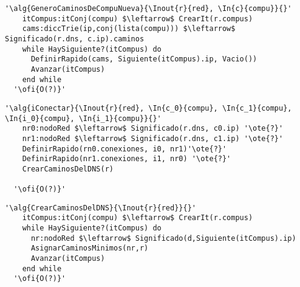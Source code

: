 \begin{lstlisting}[mathescape]
  '\alg{GeneroCaminosDeCompuNueva}{\Inout{r}{red}, \In{c}{compu}}{}'
    itCompus:itConj(compu) $\leftarrow$ CrearIt(r.compus)
    cams:diccTrie(ip,conj(lista(compu))) $\leftarrow$ Significado(r.dns, c.ip).caminos
    while HaySiguiente?(itCompus) do                                                    
      DefinirRapido(cams, Siguiente(itCompus).ip, Vacio())
      Avanzar(itCompus)
    end while
  '\ofi{O(?)}'
\end{lstlisting}

\begin{lstlisting}[mathescape]
  '\alg{iConectar}{\Inout{r}{red}, \In{c_0}{compu}, \In{c_1}{compu}, \In{i_0}{compu}, \In{i_1}{compu}}{}'
    nr0:nodoRed $\leftarrow$ Significado(r.dns, c0.ip) '\ote{?}'
    nr1:nodoRed $\leftarrow$ Significado(r.dns, c1.ip) '\ote{?}'
    DefinirRapido(rn0.conexiones, i0, nr1)'\ote{?}'
    DefinirRapido(nr1.conexiones, i1, nr0) '\ote{?}'
    CrearCaminosDelDNS(r)

  '\ofi{O(?)}'
\end{lstlisting}



\begin{lstlisting}[mathescape]
  '\alg{CrearCaminosDelDNS}{\Inout{r}{red}}{}'
    itCompus:itConj(compu) $\leftarrow$ CrearIt(r.compus)
    while HaySiguiente?(itCompus) do                                                    
      nr:nodoRed $\leftarrow$ Significado(d,Siguiente(itCompus).ip)
      AsignarCaminosMinimos(nr,r)
      Avanzar(itCompus)
    end while
  '\ofi{O(?)}'
\end{lstlisting}

